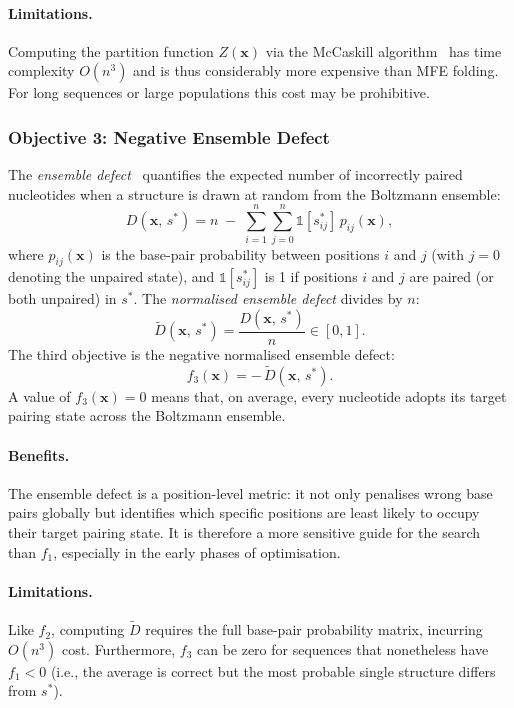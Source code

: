 \documentclass[11pt,a4paper]{article}
\begin{document}
\paragraph{Limitations.} Computing the partition function $Z(\mathbf{x})$ via
the McCaskill algorithm~\cite{mccaskill1990equilibrium} has time complexity
$O(n^3)$ and is thus considerably more expensive than MFE folding. For long
sequences or large populations this cost may be prohibitive.

\subsubsection{Objective 3: Negative Ensemble Defect}
\label{sec:obj3}

The \emph{ensemble defect}~\cite{zadeh2011nupack} quantifies the expected
number of incorrectly paired nucleotides when a structure is drawn at random
from the Boltzmann ensemble:
\[
  D(\mathbf{x},\, s^*) = n \;-\;
    \sum_{i=1}^{n}\sum_{j=0}^{n} \mathbb{1}[s^*_{ij}]\, p_{ij}(\mathbf{x}),
\]
where $p_{ij}(\mathbf{x})$ is the base-pair probability between positions $i$
and $j$ (with $j=0$ denoting the unpaired state), and $\mathbb{1}[s^*_{ij}]$
is 1 if positions $i$ and $j$ are paired (or both unpaired) in $s^*$. The
\emph{normalised ensemble defect} divides by $n$:
\[
  \tilde{D}(\mathbf{x},\, s^*) = \frac{D(\mathbf{x},\, s^*)}{n} \in [0,1].
\]
The third objective is the negative normalised ensemble defect:
\[
  f_3(\mathbf{x}) = -\,\tilde{D}(\mathbf{x},\, s^*).
\]
A value of $f_3(\mathbf{x}) = 0$ means that, on average, every nucleotide
adopts its target pairing state across the Boltzmann ensemble.

\paragraph{Benefits.} The ensemble defect is a position-level metric:
it not only penalises wrong base pairs globally but identifies which
specific positions are least likely to occupy their target pairing state.
It is therefore a more sensitive guide for the search than $f_1$, especially
in the early phases of optimisation.

\paragraph{Limitations.} Like $f_2$, computing $\tilde{D}$ requires the full
base-pair probability matrix, incurring $O(n^3)$ cost. Furthermore, $f_3$
can be zero for sequences that nonetheless have $f_1 < 0$ (i.e., the average
is correct but the most probable single structure differs from $s^*$).
\end{document}
